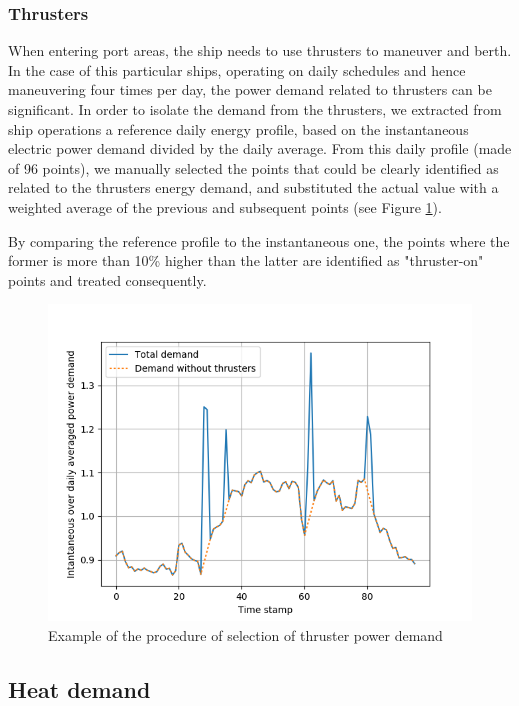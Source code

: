 \documentclass[preprint,12pt]{elsarticle}
\begin{document}
\subsubsection{Thrusters}

When entering port areas, the ship needs to use thrusters to maneuver and berth. In the case of this particular ships, operating on daily schedules and hence maneuvering four times per day, the power demand related to thrusters can be significant. In order to isolate the demand from the thrusters, we extracted from ship operations a reference daily energy profile, based on the instantaneous electric power demand divided by the daily average. From this daily profile (made of 96 points), we manually selected the points that could be clearly identified as related to the thrusters energy demand, and substituted the actual value with a weighted average of the previous and subsequent points (see Figure \ref{fig:thruster_selection}). 

By comparing the reference profile to the instantaneous one, the points where the former is more than 10\% higher than the latter are identified as "thruster-on" points and treated consequently. 

\begin{figure}
	\centering
	\includegraphics[width=0.9\linewidth]{Figures/Thruster_selection}
	\caption{Example of the procedure of selection of thruster power demand}
	\label{fig:thruster_selection}
\end{figure}


\clearpage

\subsection{Heat demand} \label{sec:app:met:heat}
\end{document}
